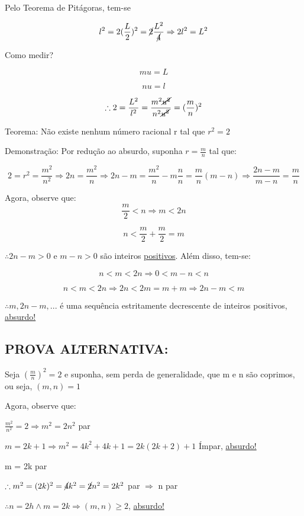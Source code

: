 \documentclass[a4paper, 12pt]{article}
\begin{document}
{Pelo Teorema de Pitágoras, tem-se}

\[
l^2 = 2 (\frac{L}{2})^2 = \cancel{2} \frac{L^2}{\cancel{4}} \Rightarrow 2l^2 = L^2
\]

{Como medir?}

\[
mu = L
\]

\[
nu = l
\]

\[
\therefore 2 = \frac{L^2}{l^2} = \frac{m^2 \cancel{u^2}}{n^2 \cancel{u^2}} = (\frac{m}{n})^2
\]

{Teorema: Não existe nenhum número racional r tal que $r^2 = 2$}

{Demonstração: Por redução ao absurdo, suponha $r= \frac{m}{n}$ tal que:}

\[
2=r^2 = \frac{m^2}{n^2} \Rightarrow 2n = \frac{m^2}{n} \Rightarrow 2n - m = \frac{m^2}{n} - m\frac{n}{n} = \frac{m}{n} (m-n) \Rightarrow \frac{2n-m}{m-n} = \frac{m}{n}
\]

{Agora, observe que:}
\[
\frac{m}{2} < n \Rightarrow m < 2n
\]

\[
n < \frac{m}{2} + \frac{m}{2} = m
\]

{$\therefore 2n-m > 0$ e $ m-n > 0$ são inteiros \underline{positivos}. Além disso, tem-se:}

\[
n < m < 2n \Rightarrow 0 < m-n < n
\]

\[
n < m < 2n \Rightarrow 2n < 2m = m + m \Rightarrow 2n - m < m
\]


{$\therefore m, 2n-m,...$ é uma sequência estritamente decrescente de inteiros positivos, \underline{absurdo!}}

\subsection{PROVA ALTERNATIVA:} 

{Seja $(\frac{m}{n})^2 = 2$ e suponha, sem perda de generalidade, que m e n são coprimos, ou seja, $(m,n)=1$}

Agora, observe que:

\begin{center}
$\frac{m^2}{n^2} = 2 \Rightarrow m^2 = 2n^2$ par 

$m = 2k + 1 \Rightarrow m^2 = 4k^2 + 4k + 1 = 2k(2k + 2) + 1$ Ímpar, \underline{absurdo!}

{m = 2k par}

$\therefore m^2 = (2k)^2 = \cancel{4}k^2 = \cancel{2}n^2 = 2k^2$ par $\Rightarrow$ n par

$\therefore n = 2h \wedge  m = 2k \Rightarrow (m,n) \ge 2$, \underline{absurdo!}
\end{center}
\end{document}
